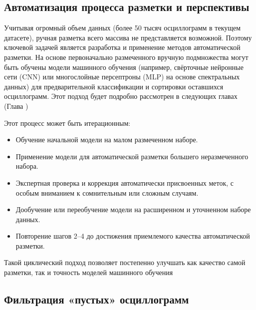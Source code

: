 \subsection{Автоматизация процесса разметки и перспективы}\label{sec:ch3_annotation_automation}

Учитывая огромный объем данных (более 50 тысяч осциллограмм в текущем датасете), ручная разметка всего массива не представляется возможной. Поэтому ключевой задачей является разработка и применение методов автоматической разметки. На основе первоначально размеченного вручную подмножества могут быть обучены модели машинного обучения (например, свёрточные нейронные сети (CNN) или многослойные персептроны (MLP) на основе спектральных данных) для предварительной классификации и сортировки оставшихся осциллограмм. Этот подход будет подробно рассмотрен в следующих главах (Глава ) 

Этот процесс может быть итерационным:

\begin{itemize}
  \item Обучение начальной модели на малом размеченном наборе.
  \item Применение модели для автоматической разметки большего неразмеченного набора.
  \item Экспертная проверка и коррекция автоматически присвоенных меток, с особым вниманием к сомнительным или сложным случаям.
  \item Дообучение или переобучение модели на расширенном и уточненном наборе данных.
  \item Повторение шагов 2--4 до достижения приемлемого качества автоматической разметки.
\end{itemize}

Такой циклический подход позволяет постепенно улучшать как качество самой разметки, так
и точность моделей машинного обучения

\subsection{Фильтрация «пустых» осциллограмм}\label{sec:ch3_empty_oscillograms_filter}


